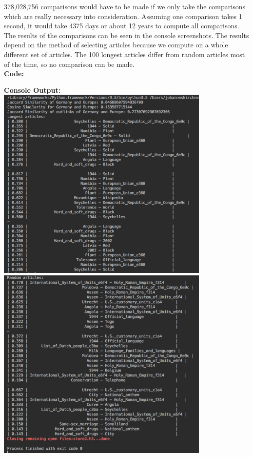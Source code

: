 \documentclass{WeSTassignment}
\begin{document}
378,028,756 comparisons would have to be made if we only take the comparisons which are really necessary into consideration. Assuming one comparison takes 1 second, it would take 4375 days or about 12 years to compute all comparisons. 
The results of the comparisons can be seen in the console screenshots. 
The results depend on the method of selecting articles because we compute on a whole different set of articles. The 100 longest articles differ from random articles most of the time, so  no comparison can be made. \\
\textbf{Code:}

\textbf{Console Output:}\\
\includegraphics[width=400px]{console_01}\\
\includegraphics[width=400px]{console_02}\\
\end{document}

